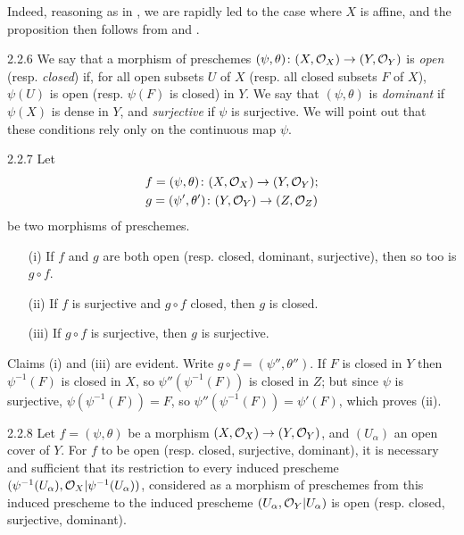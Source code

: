 Indeed, reasoning as in
, we are rapidly led to the case where $X$ is affine, and the proposition
then follows from  and .

\begin{env}{2.2.6} We say that a morphism of preschemes
$(\psi,\theta)\colon(X,\mathcal{O}_X)\to(Y,\mathcal{O}_Y)$ is \emph{open} (resp. \emph{closed})
if, for all open subsets $U$ of $X$ (resp. all closed subsets $F$ of $X$),
$\psi(U)$ is open (resp. $\psi(F)$ is closed) in $Y$. We say that
$(\psi,\theta)$ is \emph{dominant} if $\psi(X)$ is dense in $Y$, and
\emph{surjective} if $\psi$ is surjective. We will point out that these
conditions rely only on the continuous map $\psi$.
\end{env}

\begin{env}[Proposition]{2.2.7} Let
\begin{gather*}
  f=(\psi,\theta)\colon(X,\mathcal{O}_X)\to(Y,\mathcal{O}_Y);\\
  g=(\psi',\theta')\colon(Y,\mathcal{O}_Y)\to(Z,\mathcal{O}_Z)
\end{gather*}
be two morphisms of
preschemes.
\begin{itemize}
  \item[(i)] If $f$ and $g$ are both open (resp. closed, dominant, surjective),
             then so too is $g\circ f$.
  \item[(ii)] If $f$ is surjective and $g\circ f$ closed, then $g$ is closed.
  \item[(iii)] If $g\circ f$ is surjective, then $g$ is surjective.
\end{itemize}
\end{env}
Claims (i) and (iii) are evident. Write $g\circ f=(\psi'',\theta'')$.
If $F$ is closed in $Y$ then $\psi^{-1}(F)$ is closed in $X$, so
$\psi''(\psi^{-1}(F))$ is closed in $Z$; but since $\psi$ is surjective,
$\psi(\psi^{-1}(F))=F$, so $\psi''(\psi^{-1}(F))=\psi'(F)$, which proves (ii).

\begin{env}[Proposition]{2.2.8}
Let $f=(\psi,\theta)$ be a morphism
$(X,\mathcal{O}_X)\to(Y,\mathcal{O}_Y)$, and $(U_\alpha)$ an open cover of $Y$. For $f$ to be
open (resp. closed, surjective, dominant), it is necessary and sufficient that
its restriction to every induced prescheme
$(\psi^{-1}(U_\alpha),\mathcal{O}_X|\psi^{-1}(U_\alpha))$, considered as a morphism of
preschemes from this induced prescheme to the induced prescheme
$(U_\alpha,\mathcal{O}_Y|U_\alpha)$ is open (resp. closed, surjective, dominant).
\end{env}

